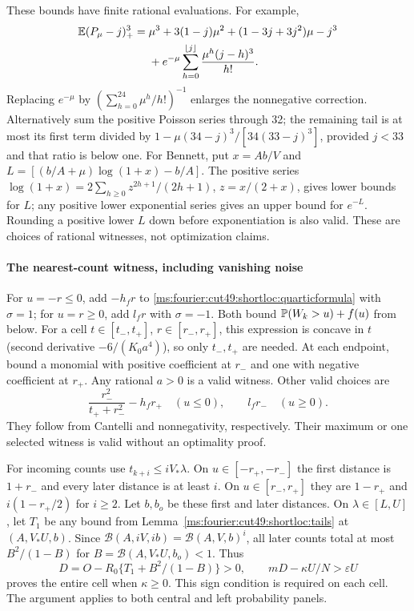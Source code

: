 These bounds have finite rational evaluations. For example,
\begin{align}\label{ms:fourier:cut49:shortloc:poissonfinite}
 \mathbb E(P_\mu-j)_+^3={}&\mu^3+3(1-j)\mu^2+(1-3j+3j^2)\mu-j^3\\
 &+e^{-\mu}\sum_{h=0}^{\lfloor j\rfloor}\frac{\mu^h(j-h)^3}{h!}.\nonumber
\end{align}
Replacing $e^{-\mu}$ by $(\sum_{h=0}^{24}\mu^h/h!)^{-1}$ enlarges the
nonnegative correction. Alternatively sum the positive Poisson series
through 32; the remaining tail is at most its first term divided by
$1-\mu(34-j)^3/[34(33-j)^3]$, provided $j<33$ and that ratio is below one.
For Bennett, put $x=Ab/V$ and
$L=[(b/A+\mu)\log(1+x)-b/A]$. The positive series
$\log(1+x)=2\sum_{h\ge0}z^{2h+1}/(2h+1)$, $z=x/(2+x)$, gives lower
bounds for $L$; any positive lower exponential series gives an upper bound
for $e^{-L}$. Rounding a positive lower $L$ down before exponentiation is
also valid. These are choices of rational witnesses, not optimization claims.

\paragraph{The nearest-count witness, including vanishing noise}

For $u=-r\le0$, add $-h_fr$ to \eqref{ms:fourier:cut49:shortloc:quarticformula} with
$\sigma=1$; for $u=r\ge0$, add $l_fr$ with $\sigma=-1$.
Both bound $\mathbb P(W_k>u)+f(u)$ from below. For a cell
$t\in[t_-,t_+]$, $r\in[r_-,r_+]$, this expression is concave in $t$
(second derivative $-6/(K_0a^4)$), so only $t_-,t_+$ are needed.
At each endpoint, bound a monomial with positive coefficient at $r_-$
and one with negative coefficient at $r_+$. Any rational $a>0$ is a valid
witness. Other valid choices are
\begin{equation}\label{ms:fourier:cut49:shortloc:ownother}
 \frac{r_-^2}{t_++r_-^2}-h_fr_+\quad(u\le0),\qquad l_fr_-\quad(u\ge0).
\end{equation}
They follow from Cantelli and nonnegativity, respectively. Their maximum
or one selected witness is valid without an optimality proof.

For incoming counts use $t_{k+i}\le iV_*\lambda$. On $u\in[-r_+,-r_-]$
the first distance is $1+r_-$ and every later distance is at least $i$.
On $u\in[r_-,r_+]$ they are $1-r_+$ and $i(1-r_+/2)$ for $i\ge2$.
Let $b,b_o$ be these first and later distances. On $\lambda\in[L,U]$,
let $T_1$ be any bound from Lemma~\ref{ms:fourier:cut49:shortloc:tails} at $(A,V_*U,b)$.
Since $\mathcal B(A,iV,ib)=\mathcal B(A,V,b)^i$, all later counts total at most
$B^2/(1-B)$ for $B=\mathcal B(A,V_*U,b_o)<1$. Thus
\begin{equation}\label{ms:fourier:cut49:shortloc:midtest}
 D=O-R_0\{T_1+B^2/(1-B)\}>0,\qquad
 mD-\kappa U/N>\varepsilon U
\end{equation}
proves the entire cell when $\kappa\ge0$. This sign condition is required on each cell. The argument applies to
both central and left probability panels.

